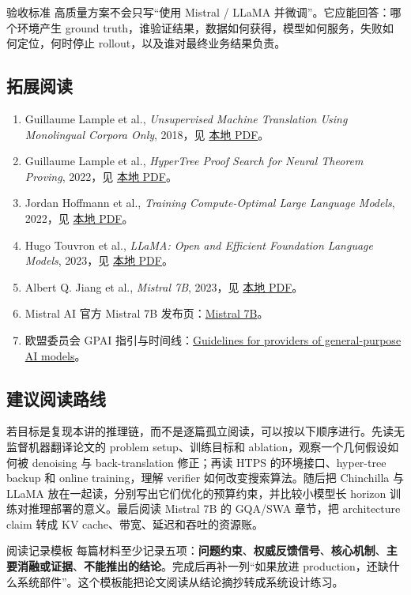 \begin{knowledgebox}{验收标准}
高质量方案不会只写“使用 Mistral / LLaMA 并微调”。它应能回答：哪个环境产生 ground truth，谁验证结果，数据如何获得，模型如何服务，失败如何定位，何时停止 rollout，以及谁对最终业务结果负责。
\end{knowledgebox}

\subsection{拓展阅读}

\begin{enumerate}
  \item Guillaume Lample et al., \emph{Unsupervised Machine Translation Using Monolingual Corpora Only}, 2018，见 \href{run:source-materials/unsupervised-machine-translation.pdf}{本地 PDF}。
  \item Guillaume Lample et al., \emph{HyperTree Proof Search for Neural Theorem Proving}, 2022，见 \href{run:source-materials/hypertree-proof-search.pdf}{本地 PDF}。
  \item Jordan Hoffmann et al., \emph{Training Compute-Optimal Large Language Models}, 2022，见 \href{run:source-materials/chinchilla-scaling-laws.pdf}{本地 PDF}。
  \item Hugo Touvron et al., \emph{LLaMA: Open and Efficient Foundation Language Models}, 2023，见 \href{run:source-materials/llama.pdf}{本地 PDF}。
  \item Albert Q. Jiang et al., \emph{Mistral 7B}, 2023，见 \href{run:source-materials/mistral-7b.pdf}{本地 PDF}。
  \item Mistral AI 官方 Mistral 7B 发布页：\href{https://mistral.ai/news/announcing-mistral-7b}{Mistral 7B}。
  \item 欧盟委员会 GPAI 指引与时间线：\href{https://digital-strategy.ec.europa.eu/en/policies/guidelines-gpai-providers}{Guidelines for providers of general-purpose AI models}。
\end{enumerate}

\subsection{建议阅读路线}

若目标是复现本讲的推理链，而不是逐篇孤立阅读，可以按以下顺序进行。先读无监督机器翻译论文的 problem setup、训练目标和 ablation，观察一个几何假设如何被 denoising 与 back-translation 修正；再读 HTPS 的环境接口、hyper-tree backup 和 online training，理解 verifier 如何改变搜索算法。随后把 Chinchilla 与 LLaMA 放在一起读，分别写出它们优化的预算约束，并比较小模型长 horizon 训练对推理部署的意义。最后阅读 Mistral 7B 的 GQA/SWA 章节，把 architecture claim 转成 KV cache、带宽、延迟和吞吐的资源账。

\begin{knowledgebox}{阅读记录模板}
每篇材料至少记录五项：\textbf{问题约束}、\textbf{权威反馈信号}、\textbf{核心机制}、\textbf{主要消融或证据}、\textbf{不能推出的结论}。完成后再补一列“如果放进 production，还缺什么系统部件”。这个模板能把论文阅读从结论摘抄转成系统设计练习。
\end{knowledgebox}


